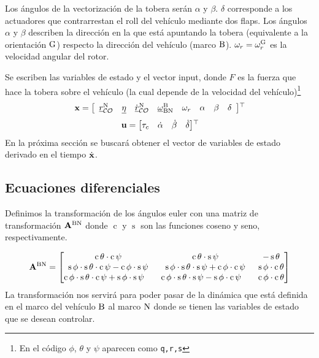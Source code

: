 Los ángulos de la vectorización de la tobera serán $\alpha$ y $\beta$. $\delta$ corresponde a los actuadores que contrarrestan el roll del vehículo mediante dos flaps. Los ángulos $\alpha$ y $\beta$ describen la dirección en la que está apuntando la tobera (equivalente a la orientación $\mathrm{G}$) respecto la dirección del vehículo (marco $\mathrm{B}$). $\omega_r=\omega_r^{\mathrm{G}}$ es la velocidad angular del rotor.

\medskip

Se escriben las variables de estado y el vector input, donde $F$ es la fuerza que hace la tobera sobre el vehículo (la cual depende de la velocidad del vehículo)\footnote{En el código $\phi$, $\theta$ y $\psi$ aparecen como \texttt{q,r,s}}
\begin{equation} \label{eq:ssVariables3D}
	\mathbf{x} = \left[
	\begin{array}{cccccccc}
		{ \underline{r} }_{\mathcal{CO}}^{\mathrm{N}} & { \underline{\eta} } &\dot{{ \underline{r} }}_{\mathcal{CO}}^{\mathrm{N}} &  { \underline{\omega} }_{\mathrm{BN}}^{\mathrm{B}} & \omega_r & \alpha & \beta & \delta
	\end{array}\right] \!^{\top}\!
\end{equation}
\begin{equation}\label{eq:ssInputs3D}
	\mathbf{u} = \begin{bmatrix}
		\tau_c & \dot{\alpha} & \dot{\beta} & \dot{\delta}
	\end{bmatrix} \!^{\top}\!
\end{equation}
En la próxima sección se buscará obtener el vector de variables de estado derivado en el tiempo $\dot{\mathbf{x}}$.

\subsection{Ecuaciones diferenciales} \label{subsec:modeloMatematico}

\def\scos{\operatorname{c}}
\def\ssin{\operatorname{s}}
Definimos la transformación de los ángulos euler con una matriz de transformación $\mathbf{A}^{\mathrm{BN}}$ donde $\scos$ y $\ssin$ son las funciones coseno y seno, respectivamente.

\begin{equation} \label{eq:matrizTransfoVehiculo}
	\transform{BN} = \begin{bmatrix}
	\scos \theta \cdot \scos \psi & \scos \theta \cdot \ssin \psi & - \ssin \theta \\
	\ssin \phi \cdot \ssin \theta \cdot \scos \psi - \scos \phi \cdot \ssin \psi & \ssin\phi \cdot \ssin\theta \cdot \ssin\psi + \scos\phi\cdot\scos\psi & \ssin\phi \cdot \scos\theta \\
	\scos\phi \cdot \ssin\theta \cdot \scos\psi + \ssin\phi \cdot \ssin\psi\quad & \scos\phi \cdot \ssin\theta \cdot \ssin\psi - \ssin\phi \cdot \scos\psi \quad& \scos\phi \cdot \scos\theta
	\end{bmatrix}
\end{equation}
La transformación nos servirá para poder pasar de la dinámica que está definida en el marco del vehículo $\mathrm{B}$ al marco $\mathrm{N}$ donde se tienen las variables de estado que se desean controlar.

